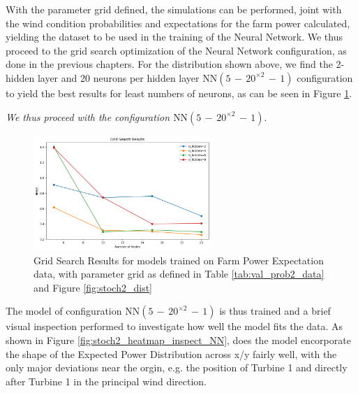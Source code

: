 \documentclass[preprint,12pt]{elsarticle}
\begin{document}
With the parameter grid defined, the simulations can be performed, joint with the wind condition probabilities and expectations for the farm power calculated, yielding the dataset to be used in the training of the Neural Network. We thus proceed to the grid search optimization of the Neural Network configuration, as done in the previous chapters. For the distribution shown above, we find the 2-hidden layer and 20 neurons per hidden layer $\text{NN}(5\,{-}\,20^{\times2}\,{-}\,1)$ configuration to yield the best results for least numbers of neurons, as can be seen in Figure \ref{fig:stoch2_NNopti}. 

\textit{We thus proceed with the configuration $\text{NN}(5\,{-}\,20^{\times2}\,{-}\,1)$}.


\begin{figure}[h] 
	\centering
	\includegraphics[width=0.6\textwidth]{../figures/optimization/stoch2/stoch2_NNopti.png} 
	\caption{Grid Search Results for models trained on Farm Power Expectation data, with parameter grid as defined in Table 	\ref{tab:val_prob2_data} and Figure  \ref{fig:stoch2_dist} }
	\label{fig:stoch2_NNopti}
\end{figure} 


The model of configuration $\text{NN}(5\,{-}\,20^{\times2}\,{-}\,1)$ is thus trained and a brief visual inspection performed to investigate how well the model fits the data. As shown in Figure \ref{fig:stoch2_heatmap_inspect_NN}, does the model encorporate the shape of the Expected Power Distribution across x/y fairly well, with the only major deviations near the orgin, e.g. the position of Turbine 1 and directly after Turbine 1 in the principal wind direction. 
\end{document}

